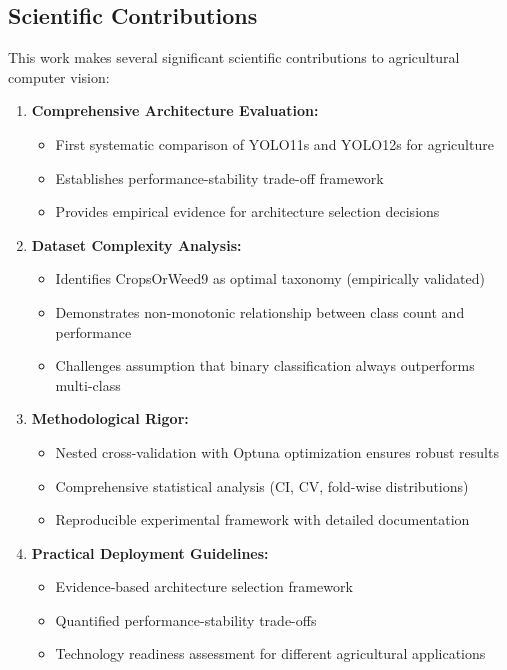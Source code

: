 \subsection{Scientific Contributions}

This work makes several significant scientific contributions to agricultural computer vision:

\begin{enumerate}
    \item \textbf{Comprehensive Architecture Evaluation:}
    \begin{itemize}
        \item First systematic comparison of YOLO11s and YOLO12s for agriculture
        \item Establishes performance-stability trade-off framework
        \item Provides empirical evidence for architecture selection decisions
    \end{itemize}
    
    \item \textbf{Dataset Complexity Analysis:}
    \begin{itemize}
        \item Identifies CropsOrWeed9 as optimal taxonomy (empirically validated)
        \item Demonstrates non-monotonic relationship between class count and performance
        \item Challenges assumption that binary classification always outperforms multi-class
    \end{itemize}
    
    \item \textbf{Methodological Rigor:}
    \begin{itemize}
        \item Nested cross-validation with Optuna optimization ensures robust results
        \item Comprehensive statistical analysis (CI, CV, fold-wise distributions)
        \item Reproducible experimental framework with detailed documentation
    \end{itemize}
    
    \item \textbf{Practical Deployment Guidelines:}
    \begin{itemize}
        \item Evidence-based architecture selection framework
        \item Quantified performance-stability trade-offs
        \item Technology readiness assessment for different agricultural applications
    \end{itemize}
\end{enumerate}

